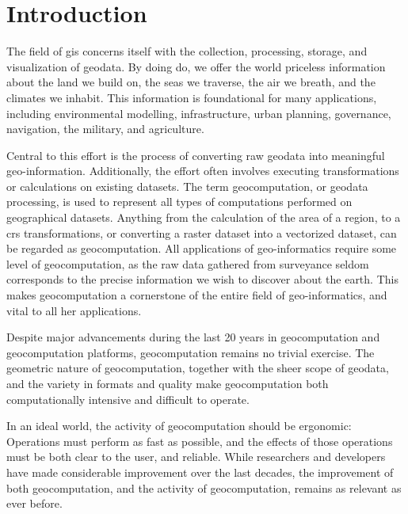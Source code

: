 \chapter{Introduction}


The field of \ac{gis} concerns itself with the collection, processing, storage, and visualization of geodata. 
By doing do, we offer the world priceless information about the land we build on, the seas we traverse, the air we breath, and the climates we inhabit. 
This information is foundational for many applications, including environmental modelling, infrastructure, urban planning, governance, navigation, the military, and agriculture.   

Central to this effort is the process of converting raw geodata into meaningful geo-information. 
Additionally, the effort often involves executing transformations or calculations on existing datasets. 
The term \ac{geocomputation}, or geodata processing, is used to represent all types of computations performed on geographical datasets. Anything from the calculation of the area of a region, to a \ac{crs} transformations, or converting a raster dataset into a vectorized dataset, can be regarded as geocomputation.
All applications of geo-informatics require some level of geocomputation, as the raw data gathered from surveyance seldom corresponds to the precise information we wish to discover about the earth.       
This makes geocomputation a cornerstone of the entire field of geo-informatics, and vital to all her applications.

Despite major advancements during the last 20 years in geocomputation and geocomputation platforms, geocomputation remains no trivial exercise. 
The geometric nature of geocomputation, together with the sheer scope of geodata, and the variety in formats and quality make geocomputation both computationally intensive and difficult to operate. 

In an ideal world, the activity of geocomputation should be ergonomic: Operations must perform as fast as possible, and the effects of those operations must be both clear to the user, and reliable.
While researchers and developers have made considerable improvement over the last decades, the improvement of both geocomputation, and the activity of geocomputation, remains as relevant as ever before. 

